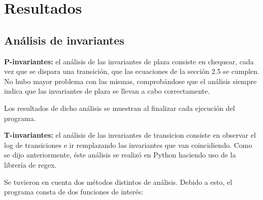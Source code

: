 \documentclass{article}
\begin{document}
    \section{Resultados}
    \subsection{Análisis de invariantes}
    \textbf{P-invariantes: } el análisis de las invariantes de plaza consiste en chequear, 
    cada vez que se dispara una transición, que las ecuaciones de la sección 2.5 se cumplen.
    No hubo mayor problema con las mismas, comprobándose que el análisis siempre indica que
    las invariantes de plaza se llevan a cabo correctamente. \par
    Los resultados de dicho análisis se muestran al finalizar cada ejecución del programa.
    \newline \par
    \textbf{T-invariantes: } el análisis de las invariantes de transicion consiste en 
    observar el log de transiciones e ir remplazando las invariantes que van coincidiendo.
    Como se dijo anteriormente, éste análisis se realizó en Python haciendo uso de la 
    librería de regex. \par
    Se tuvieron en cuenta dos métodos distintos de análisis. Debido a esto, el programa 
    consta de dos funciones de interés: \par
\end{document}
